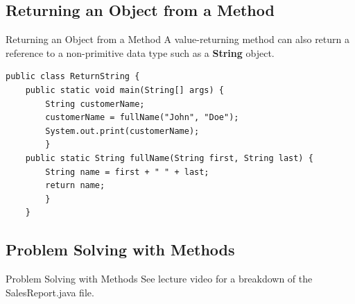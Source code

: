\documentclass[11pt]{beamer}
\begin{document}
\subsection{Returning an Object from a Method}
\begin{frame}[fragile]{Returning an Object from a Method}
A value-returning method can also return a reference to a non-primitive data type such as a \textbf{String} object.
\begin{lstlisting}
public class ReturnString {
    public static void main(String[] args) {
        String customerName;
        customerName = fullName("John", "Doe");
        System.out.print(customerName);
        }
    public static String fullName(String first, String last) {
        String name = first + " " + last;
        return name;
        }
    }
\end{lstlisting}
\end{frame}

\subsection{Problem Solving with Methods}
\begin{frame}{Problem Solving with Methods}
See lecture video for a breakdown of the SalesReport.java file.
\end{frame}
\end{document}
